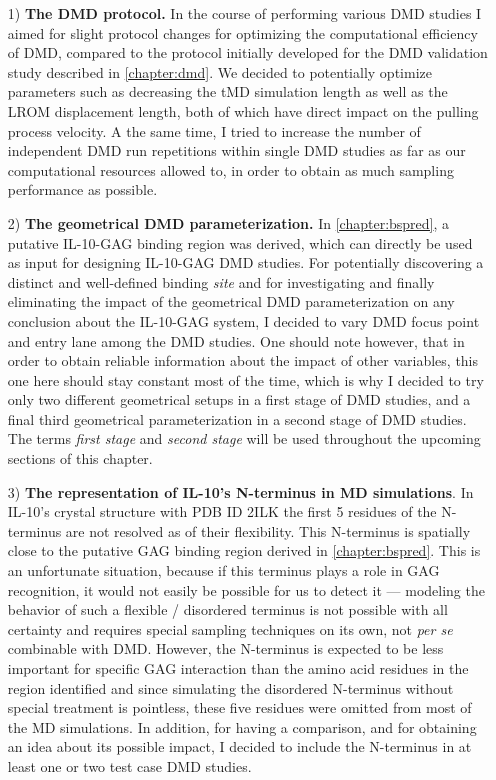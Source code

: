 \begin{itemize}

\item[1)] \textbf{The DMD protocol.} In the course of performing various DMD
studies I aimed for slight protocol changes for optimizing the computational
efficiency of DMD, compared to the protocol initially developed for the DMD
validation study described in \cref{chapter:dmd}. We decided to potentially
optimize parameters such as decreasing the tMD simulation length as well as the
LROM displacement length, both of which have direct impact on the pulling
process velocity. A the same time, I tried to increase the number of
independent DMD run repetitions within single DMD studies as far as our
computational resources allowed to, in order to obtain as much sampling
performance as possible.

\item[2)] \textbf{The geometrical DMD parameterization.} In
\cref{chapter:bspred}, a putative IL-10-GAG binding region was derived, which
can directly be used as input for designing IL-10-GAG DMD studies. For
potentially discovering a distinct and well-defined binding \textit{site} and
for investigating and finally eliminating the impact of the geometrical DMD
parameterization on any conclusion about the IL-10-GAG system, I decided to vary
DMD focus point and entry lane among the DMD studies. One should note however,
that in order to obtain reliable information about the impact of other
variables, this one here should stay constant most of the time, which is why I
decided to try only two different geometrical setups in a first stage of DMD
studies, and a final third geometrical parameterization in a second stage of
DMD studies. The terms \textit{first stage} and \textit{second stage} will be
used throughout the upcoming sections of this chapter.

\item[3)] \textbf{The representation of IL-10's N-terminus in MD simulations}.
In IL-10's crystal structure with PDB ID 2ILK the first 5 residues of the
N-terminus are not resolved as of their flexibility. This N-terminus is
spatially close to the putative GAG binding region derived in
\cref{chapter:bspred}. This is an unfortunate situation, because if this
terminus plays a role in GAG recognition, it would not easily be possible for us
to detect it --- modeling the behavior of such a flexible / disordered terminus
is not possible with all certainty and requires special sampling techniques on
its own, not \textit{per se} combinable with DMD. However, the N-terminus is
expected to be less important for specific GAG interaction than the amino acid
residues in the region identified and since simulating the disordered N-terminus
without special treatment is pointless, these five residues were omitted from
most of the MD simulations. In addition, for having a comparison, and for
obtaining an idea about its possible impact, I decided to include the
N-terminus in at least one or two test case DMD studies.


\end{itemize}
